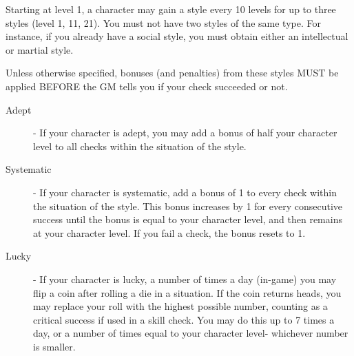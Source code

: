 Starting at level 1, a character may gain a style every 10 levels for up to three styles (level 1, 11, 21). You must not have two styles of the same type. For instance, if you already have a social style, you must obtain either an intellectual or martial style.

Unless otherwise specified, bonuses (and penalties) from these styles MUST be applied BEFORE the GM tells you if your check succeeded or not.

\begin{description}
\item[Adept] - If your character is adept, you may add a bonus of half your character level to all checks within the situation of the style.
\item[Systematic] - If your character is systematic, add a bonus of 1 to every check within the situation of the style. This bonus increases by 1 for every consecutive success until the bonus is equal to your character level, and then remains at your character level. If you fail a check, the bonus resets to 1.
\item[Lucky] - If your character is lucky, a number of times a day (in-game) you may flip a coin after rolling a die in a situation. If the coin returns heads, you may replace your roll with the highest possible number, counting as a critical success if used in a skill check. You may do this up to 7 times a day, or a number of times equal to your character level- whichever number is smaller.


\end{description}
